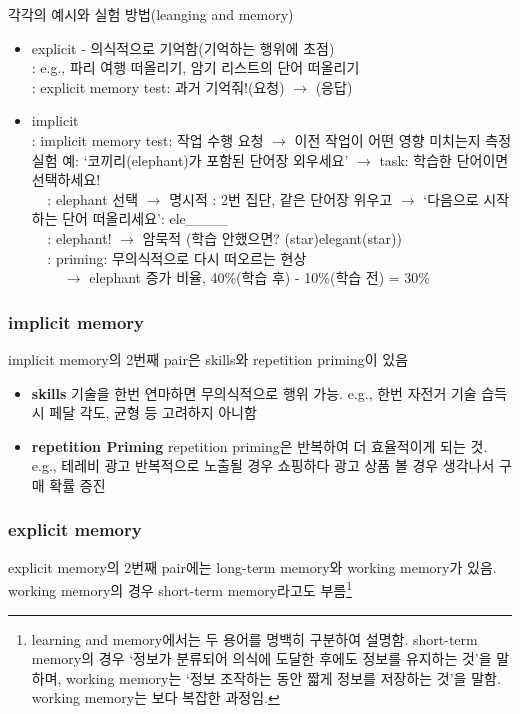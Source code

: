 \documentclass[../note.tex]{subfiles}
\begin{document}
\begin{example}각각의 예시와 실험 방법(leanging and memory)\\
  \begin{itemize}
    \item explicit - 의식적으로 기억함(기억하는 행위에 초점)\\
	: e.g., 파리 여행 떠올리기, 암기 리스트의 단어 떠올리기\\
	: explicit memory test: 과거 기억줘!(요청) $\rightarrow$ (응답)
    \item implicit\\
  : implicit memory test: 작업 수행 요청 $\rightarrow$ 이전 작업이 어떤 영향 미치는지 측정\\
  실험 예: `코끼리(elephant)가 포함된 단어장 외우세요' $\rightarrow$ task: 학습한 단어이면 선택하세요!\\
  $\;\;\;\;$: elephant 선택 $\rightarrow$ 명시적
	: 2번 집단, 같은 단어장 위우고 $\rightarrow$ `다음으로 시작하는 단어 떠올리세요': ele\_\_\_\_\\
  $\;\;\;\;$: elephant! $\rightarrow$ 암묵적 (학습 안했으면? (star)elegant(star))\\
  $\;\;\;\;$: priming: 무의식적으로 다시 떠오르는 현상\\
  $\;\;\;\;\;\;\;\;$$\rightarrow$ elephant 증가 비율, 40\%(학습 후) - 10\%(학습 전) = 30\%
  \end{itemize}
\end{example}

\subsubsection{implicit memory}
implicit memory의 2번째 pair은 skills와 repetition priming이 있음

\begin{itemize}
  \item{\textbf{skills}}
    기술을 한번 연마하면 무의식적으로 행위 가능. e.g., 한번 자전거 기술 습득시 페달 각도, 균형 등 고려하지 아니함

  \item{\textbf{repetition Priming}}
    repetition priming은 반복하여 더 효율적이게 되는 것. e.g., 테레비 광고 반복적으로 노출될 경우 쇼핑하다 광고 상품 볼 경우 생각나서 구매 확률 증진
\end{itemize}

\subsubsection{explicit memory}
explicit memory의 2번째 pair에는 long-term memory와 working memory가 있음.
working memory의 경우 short-term memory라고도 부름\footnote{learning and memory에서는 두 용어를 명백히 구분하여 설명함. short-term memory의 경우 `정보가 분류되어 의식에 도달한 후에도 정보를 유지하는 것'을 말하며, working memory는 `정보 조작하는 동안 짧게 정보를 저장하는 것'을 말함. working memory는 보다 복잡한 과정임.}
\end{document}
